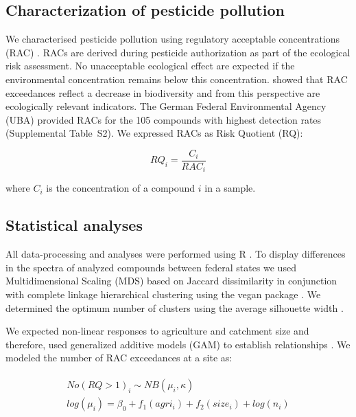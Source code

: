 \documentclass[journal=esthag,manuscript=article]{achemso}
\begin{document}
\subsection{Characterization of pesticide pollution}
We characterised pesticide pollution using regulatory acceptable concentrations (RAC) \citep{brock_linking_2010}.
RACs are derived during pesticide authorization as part of the ecological risk assessment.
No unacceptable ecological effect are expected if the environmental concentration remains below this concentration.
\citet{stehle_pesticide_2015} showed that RAC exceedances reflect a decrease in biodiversity and from this perspective are ecologically relevant indicators. 
The German Federal Environmental Agency (UBA) provided RACs for the 105 compounds with highest detection rates (Supplemental Table~S2). 
We expressed RACs as Risk Quotient (RQ):

\begin{equation}
RQ_i = \frac{C_i}{RAC_i}
\end{equation}

where $C_i$ is the concentration of a compound $i$ in a sample.


\subsection{Statistical analyses}
All data-processing and analyses were performed using R \citep{r_core_team_r:_2016}.
To display differences in the spectra of analyzed compounds between federal states we used Multidimensional Scaling (MDS) based on Jaccard dissimilarity in conjunction with complete linkage hierarchical clustering using the vegan package \citep{oksanen_vegan:_2016}.
We determined the optimum number of clusters using the average silhouette width \citep{rousseeuw1987silhouettes}. 

We expected non-linear responses to agriculture and catchment size and therefore, used generalized additive models (GAM) to establish relationships \citep{fewster_analysis_2000}.
We modeled the number of RAC exceedances at a site as:

\begin{align}
\begin{split}
  No(RQ > 1)_i \sim NB(\mu_i, \kappa) \\
  log(\mu_i)= \beta_0 + f_1(agri_i) + f_2(size_i) + log(n_i) \\
\end{split}
\end{align}
\end{document}
